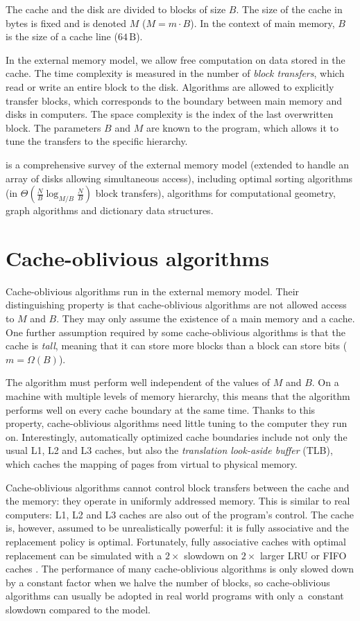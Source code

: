 The cache and the disk are divided to blocks of size $B$. The size of the cache 
in bytes is fixed and is denoted $M$ ($M=m\cdot B$).
In the context of main memory, $B$ is the size of a cache line
($64\,\text{B}$).

In the external memory model, we allow free computation on data
stored in the cache. The time complexity is measured in the number of
\emph{block transfers}, which read or write an entire block to the disk.
Algorithms are allowed to explicitly transfer blocks, which corresponds
to the boundary between main memory and disks in computers.
The space complexity is the index of the last overwritten block.
The parameters $B$ and $M$ are known to the program, which allows it to tune
the transfers to the specific hierarchy.

\cite{em-ads} is a comprehensive survey of the external memory model
(extended to handle an array of disks allowing simultaneous access), including
optimal sorting algorithms (in $\Theta(\frac{N}{B}\log_{M/B}\frac{N}{B})$
block transfers), algorithms for computational geometry, graph algorithms
and dictionary data structures.

\section{Cache-oblivious algorithms}
Cache-oblivious algorithms run in the external memory model.
Their distinguishing property is that cache-oblivious algorithms
are not allowed access to $M$ and $B$. They may only assume the existence
of a main memory and a cache.
One further assumption required by some cache-oblivious algorithms is
that the cache is \emph{tall}, meaning that it can store more blocks
than a block can store bits ($m=\Omega(B)$).

The algorithm must perform well independent of the values of $M$ and $B$.
On a machine with multiple levels of memory hierarchy, this means that
the algorithm performs well on every cache boundary at the same time.
Thanks to this property, cache-oblivious algorithms need little tuning to the
computer they run on. Interestingly, automatically optimized cache boundaries
include not only the usual L1, L2 and L3 caches, but also the \emph{translation
look-aside buffer} (TLB), which caches the mapping of pages from virtual to
physical memory.

Cache-oblivious algorithms cannot control block transfers between the cache
and the memory: they operate in uniformly addressed memory. This is similar
to real computers: L1, L2 and L3 caches are also out of the program's control.
The cache is, however, assumed to be unrealistically powerful: it is fully
associative and the replacement policy is optimal. Fortunately, fully
associative caches with optimal replacement can be simulated with a
$2\times$ slowdown on $2\times$ larger LRU or FIFO caches
\cite{sleator1985amortized}.
The performance of many cache-oblivious algorithms is only slowed down
by a constant factor when we halve the number of blocks, so cache-oblivious
algorithms can usually be adopted in real world programs with only a~constant
slowdown compared to the model.

